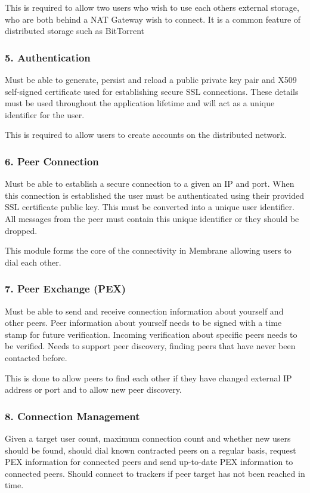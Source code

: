 \documentclass[11pt, a4paper, twocolumn, twoside]{report}
\begin{document}
This is required to allow two users who wish to use each others external storage, who are both behind a NAT Gateway wish to connect. It is a common feature of distributed storage such as BitTorrent

\subsubsection{5. Authentication}
Must be able to generate, persist and reload a public private key pair and X509 self-signed certificate used for establishing secure SSL connections. These details must be used throughout the application lifetime and will act as a unique identifier for the user.

This is required to allow users to create accounts on the distributed network.

\subsubsection{6. Peer Connection}
Must be able to establish a secure connection to a given an IP and port. When this connection is established the user must be authenticated using their provided SSL certificate public key. This must be  converted into a unique user identifier. All messages from the peer must contain this unique identifier or they should be dropped.

This module forms the core of the connectivity in Membrane allowing users to dial each other.

\subsubsection{7. Peer Exchange (PEX)}
Must be able to send and receive connection information about yourself and other peers. Peer information about yourself needs to be signed with a time stamp for future verification. Incoming verification about specific peers needs to be verified. Needs to support peer discovery, finding peers that have never been contacted before.

This is done to allow peers to find each other if they have changed external IP address or port and to allow new peer discovery.

\subsubsection{8. Connection Management}
Given a target user count, maximum connection count and whether new users should be found, should dial known contracted peers on a regular basis, request PEX information for connected peers and send up-to-date PEX information to connected peers. Should connect to trackers if peer target has not been reached in time.
\end{document}
